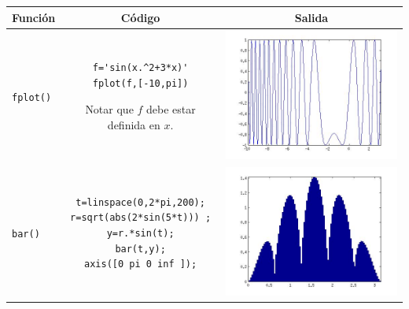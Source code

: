 \documentclass[11pt]{article}
\begin{document}
 \begin{center}
  \begin{longtable}{||l|c|c||}
   Funci\'on 		& C\'odigo 		& Salida \\
   \hline

\texttt{fplot()}		
  &
\begin{minipage}{3in}
\begin{verbatim}
f='sin(x.^2+3*x)'
fplot(f,[-10,pi])
\end{verbatim}

Notar que $f$ debe estar definida en $x$.
\end{minipage}
&
\begin{minipage}{0.3\textwidth}
\includegraphics[width=\textwidth]{./ej1.jpg}
\end{minipage}
\\
\hline
\texttt{bar()}		
  & 
\begin{minipage}{3in}
\begin{verbatim}
t=linspace(0,2*pi,200);
r=sqrt(abs(2*sin(5*t))) ;
y=r.*sin(t);
bar(t,y);
axis([0 pi 0 inf ]);
\end{verbatim}
\end{minipage}
&
\begin{minipage}{0.3\textwidth}
\includegraphics[width=\textwidth]{./ej2.jpg}

\end{minipage}
\end{longtable}
\end{center}
\end{document}
